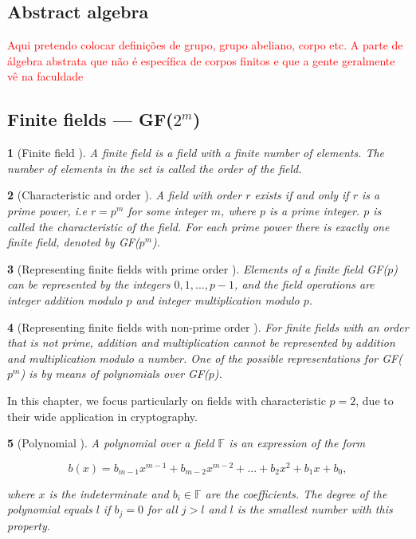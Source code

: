 \documentclass{report}
\newtheorem*{concept}{}{\bfseries}{\itshape}
\begin{document}
\subsection{Abstract algebra}
\textcolor{red}{Aqui pretendo colocar definições de grupo, grupo abeliano, corpo etc. A parte de álgebra abstrata que não é específica de corpos finitos e que a gente geralmente vê na faculdade}

\subsection{Finite fields --- GF($2^m$)}

\begin{concept}[Finite field \cite{DesignOfRijndael2002}]
A \emph{finite field} is a field with a finite number of elements. The number of elements in the set is called the \emph{order} of the field. 
\end{concept}

\begin{concept}[Characteristic and order \cite{DesignOfRijndael2002}]
A field with order $r$ exists if and only if $r$ is a prime power, i.e $r = p^m$ for some integer $m$, where $p$ is a prime integer. $p$ is called the \emph{characteristic} of the field. For each prime power there is exactly one finite field, denoted by GF($p^m$).
\end{concept}

\begin{concept}[Representing finite fields with prime order \cite{DesignOfRijndael2002}]
Elements of a finite field GF($p$) can be represented by the integers $0, 1, ..., p - 1$, and the field operations are integer addition modulo $p$ and integer multiplication modulo $p$.
\end{concept}

\begin{concept}[Representing finite fields with non-prime order \cite{DesignOfRijndael2002}]
For finite fields with an order that is not prime, addition and multiplication cannot be represented by addition and multiplication modulo a number. One of the possible representations for GF($p^m$) is by means of \emph{polynomials over GF($p$)}.
\end{concept}

In this chapter, we focus particularly on fields with characteristic $p = 2$, due to their wide application in cryptography.

\begin{concept}[Polynomial \cite{DesignOfRijndael2002}]
A polynomial over a field $\mathbb{F}$ is an expression of the form

$$
b(x) = b_{m-1}x^{m-1} + b_{m-2}x^{m-2} + ... + b_2x^2 + b_1x + b_0,
$$

where $x$ is the \emph{indeterminate} and $b_i \in \mathbb{F}$ are the coefficients. The \emph{degree} of the polynomial equals $l$ if $b_j = 0$ for all $j > l$ and $l$ is the smallest number with this property.
\end{concept}
\end{document}
